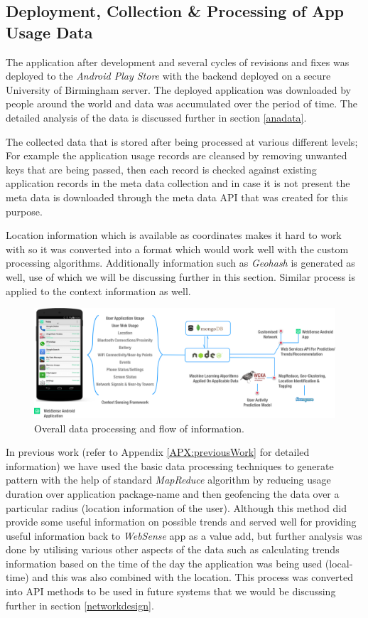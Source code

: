 \documentclass[prodmode,acmtecs]{acmsmall}
\begin{document}
\subsection{Deployment, Collection \& Processing of App Usage Data}

The application after development and several cycles of revisions and fixes was deployed to the \textit{Android Play Store} with the backend deployed on a secure University of Birmingham server. The deployed application was downloaded by people around the world and data was accumulated over the period of time. The detailed analysis of the data is discussed further in section \ref{anadata}.

The collected data that is stored after being processed at various different levels; For example the application usage records are cleansed by removing unwanted keys that are being passed, then each record is checked against existing application records in the meta data collection and in case it is not present the meta data is downloaded through the meta data API that was created for this purpose. 

Location information which is available as coordinates makes it hard to work with so it was converted into a format which would work well with the custom processing algorithms. Additionally information such as \textit{Geohash} is generated as well, use of which we will be discussing further in this section. Similar process is applied to the context information as well.

\begin{figure}[hbtp]
 \centering
 \includegraphics[width=120mm]{app_flow.png}
  \caption {Overall data processing and flow of information.}
 \label{fig:dataflow}
\end{figure}

In previous work (refer to Appendix \ref{APX:previousWork} for detailed information) we have used the basic data processing techniques to generate pattern with the help of standard \textit{MapReduce} algorithm by reducing usage duration over application package-name and then geofencing the data over a particular radius (location information of the user). Although this method did provide some useful information on possible trends and served well for providing useful information back to \textit{WebSense} app as a value add, but further analysis was done by utilising various other aspects of the data such as calculating trends information based on the time of the day the application was being used (local-time) and this was also combined with the location. This process was converted into API methods to be used in future systems that we would be discussing further in section \ref{networkdesign}.
\end{document}
